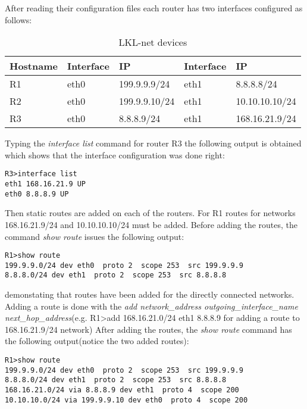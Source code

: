 {{After reading their configuration files each router has two interfaces configured as follows:
\begin{center}
  \begin{table}[htb]
  \begin{center}
  \begin{tabular}{| l | l | l | l | l |}
    \hline
      Hostname & Interface & IP & Interface & IP \\ \hline
      R1 & eth0 & 199.9.9.9/24 & eth1 & 8.8.8.8/24 \\ \hline
      R2 & eth0 & 199.9.9.10/24 & eth1 & 10.10.10.10/24\\ \hline
      R3 & eth0 & 8.8.8.9/24 & eth1 & 168.16.21.9/24 \\
    \hline
  \end{tabular}
  \end{center}
  \caption{LKL-net devices}
  \label{table:tdevices}
  \end{table}
\end{center}
Typing the \textit{interface list} command for router R3 the following output is obtained which shows that the interface configuration was done right:
\lstset{language=TeX, caption=Router R3 interfaces}
\begin{lstlisting}
R3>interface list  
eth1 168.16.21.9 UP
eth0 8.8.8.9 UP
\end{lstlisting}

Then static routes are added on each of the routers.
For R1 routes for networks 168.16.21.9/24 and 10.10.10.10/24 must be added.
Before adding the routes, the command \textit{show route} issues the following output:
\lstset{language=TeX, caption=Directly connected routes}
\begin{lstlisting}
R1>show route  
199.9.9.0/24 dev eth0  proto 2  scope 253  src 199.9.9.9 
8.8.8.0/24 dev eth1  proto 2  scope 253  src 8.8.8.8 
\end{lstlisting}
demonstating that routes have been added for the directly connected networks.
Adding a route is done with the \textit{add network_address outgoing_interface_name next_hop_address}(e.g. R1>add 168.16.21.0/24 eth1 8.8.8.9 for adding a route to 168.16.21.9/24 network)
After adding the routes, the \textit{show route} command has the following output(notice the two added routes):
\lstset{language=TeX, caption=R1 routing table}
\begin{lstlisting}
R1>show route  
199.9.9.0/24 dev eth0  proto 2  scope 253  src 199.9.9.9 
8.8.8.0/24 dev eth1  proto 2  scope 253  src 8.8.8.8 
168.16.21.0/24 via 8.8.8.9 dev eth1  proto 4  scope 200
10.10.10.0/24 via 199.9.9.10 dev eth0  proto 4  scope 200
\end{lstlisting}

}}
